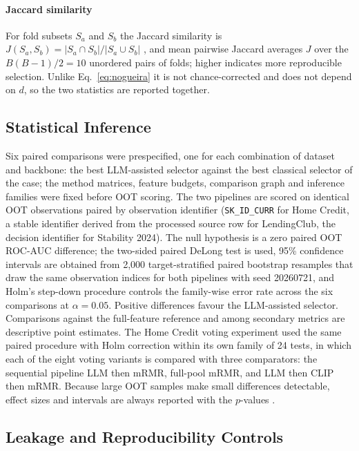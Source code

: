 \documentclass[final,5p,twocolumn]{elsarticle}
\begin{document}
\paragraph{Jaccard similarity}
For fold subsets $S_a$ and $S_b$ the Jaccard similarity is $J(S_a,S_b)=|S_a\cap S_b|/|S_a\cup S_b|$ \cite{jaccard1901}, and mean pairwise Jaccard averages $J$ over the $B(B-1)/2=10$ unordered pairs of folds; higher indicates more reproducible selection. Unlike Eq.~\eqref{eq:nogueira} it is not chance-corrected and does not depend on $d$, so the two statistics are reported together.

\subsection{Statistical Inference}
\label{subsec:inference}

Six paired comparisons were prespecified, one for each combination of dataset and backbone: the best LLM-assisted selector against the best classical selector of the case; the method matrices, feature budgets, comparison graph and inference families were fixed before OOT scoring. The two pipelines are scored on identical OOT observations paired by observation identifier (\texttt{SK\_\allowbreak ID\_\allowbreak CURR} for Home Credit, a stable identifier derived from the processed source row for LendingClub, the decision identifier for Stability 2024). The null hypothesis is a zero paired OOT ROC-AUC difference; the two-sided paired DeLong test \cite{delong1988} is used, 95\% confidence intervals are obtained from 2,000 target-stratified paired bootstrap resamples that draw the same observation indices for both pipelines \cite{efron1993} with seed 20260721, and Holm's step-down procedure \cite{holm1979} controls the family-wise error rate across the six comparisons at $\alpha=0.05$. Positive differences favour the LLM-assisted selector. Comparisons against the full-feature reference and among secondary metrics are descriptive point estimates. The Home Credit voting experiment used the same paired procedure with Holm correction within its own family of 24 tests, in which each of the eight voting variants is compared with three comparators: the sequential pipeline LLM then mRMR, full-pool mRMR, and LLM then CLIP then mRMR. Because large OOT samples make small differences detectable, effect sizes and intervals are always reported with the $p$-values \cite{demsar2006}.

\subsection{Leakage and Reproducibility Controls}
\label{subsec:leakage_controls}
\end{document}
